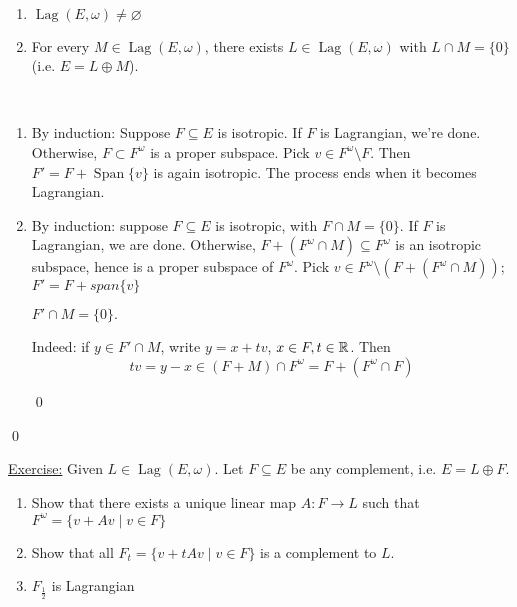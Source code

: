 \documentclass[x11names,reqno,14pt]{extarticle}
\DeclareMathOperator{\Lag}{Lag}
\begin{document}
\prop
\,
\begin{enumerate}[label=(\alph*)]

\item $\Lag(E, \omega) \neq \varnothing$

\item For every $M \in \Lag(E, \omega)$, there exists $L \in \Lag(E,\omega)$ with $L \cap M = \{0\}$ (i.e. $E = L \oplus M$).

\end{enumerate}

\proof
\,
\begin{enumerate}[label=(\alph*)]

\item By induction: Suppose $F \subseteq E$ is isotropic. If $F$ is Lagrangian, we're done. Otherwise, $F \subset F^\omega$ is a proper subspace. Pick $v \in F^\omega \setminus F$. Then $F' = F + \operatorname{Span}\{v\}$ is again isotropic. The process ends when it becomes Lagrangian.

\item By induction: suppose $F \subseteq E$ is isotropic, with $F\cap M = \{0\}$. If $F$ is Lagrangian, we are done. Otherwise, $F + (F^\omega \cap M) \subseteq F^\omega$ is an isotropic subspace, hence is a proper subspace of $F^\omega$. Pick $v \in F^\omega\setminus (F + (F^\omega \cap M))$; $F' = F + span\{v\}$

\claim $F' \cap M = \{0\}.$

\proof

Indeed: if $y \in F'\cap M$, write $y = x + tv$, $x \in F, t \in \mathbb{R}$. Then
\[
tv = y - x \in (F + M) \cap F^\omega = F + (F^\omega \cap F)
\]

\qed

\end{enumerate}

\qed

\underline{Exercise:} Given $L \in \Lag(E, \omega)$. Let $F \subseteq E$ be any complement, i.e. $E = L \oplus F$. 
\begin{enumerate}[label=(\roman*)]

\item Show that there exists a unique linear map $A:F\to L$ such that $F^\omega = \{v + Av\mid v \in F\}$

\item Show that all $F_t = \{v + tAv \mid v \in F\}$ is a complement to $L$.

\item $F_{\frac12}$ is Lagrangian

\end{enumerate}
\end{document}
